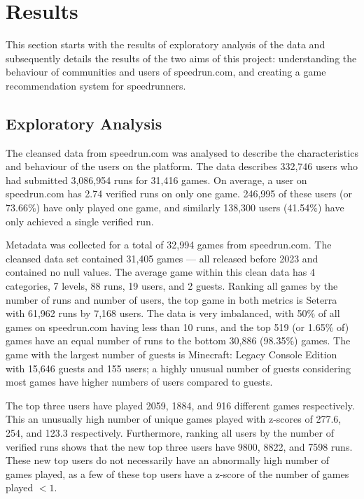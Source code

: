 \section{Results}

This section starts with the results of exploratory analysis of the data and subsequently details the results of the two aims of this project: understanding the behaviour of communities and users of speedrun.com, and creating a game recommendation system for speedrunners.

\subsection{Exploratory Analysis}

The cleansed data from speedrun.com was analysed to describe the characteristics and behaviour of the users on the platform. The data describes 332,746 users who had submitted 3,086,954 runs for 31,416 games. On average, a user on speedrun.com has 2.74 verified runs on only one game. 246,995 of these users (or 73.66\%) have only played one game, and similarly 138,300 users (41.54\%) have only achieved a single verified run. 


Metadata was collected for a total of 32,994 games from speedrun.com. The cleansed data set contained 31,405 games — all released before 2023 and contained no null values. The average game within this clean data has 4 categories, 7 levels, 88 runs, 19 users, and 2 guests. Ranking all games by the number of runs and number of users, the top game in both metrics is Seterra with 61,962 runs by 7,168 users. The data is very imbalanced, with 50\% of all games on speedrun.com having less than 10 runs, and the top 519 (or 1.65\% of) games have an equal number of runs to the bottom 30,886 (98.35\%) games. The game with the largest number of guests is Minecraft: Legacy Console Edition with 15,646 guests and 155 users; a highly unusual number of guests considering most games have higher numbers of users compared to guests.


The top three users have played 2059, 1884, and 916 different games respectively. This an unusually high number of unique games played with z-scores of 277.6, 254, and 123.3 respectively. Furthermore, ranking all users by the number of verified runs shows that the new top three users have 9800, 8822, and 7598 runs. These new top users do not necessarily have an abnormally high number of games played, as a few of these top users have a z-score of the number of games played $<1$.

